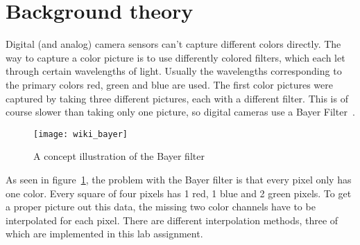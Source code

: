 \section{Background theory}

Digital (and analog) camera sensors can't capture different colors directly.
The way to capture a color picture is to use differently colored filters, which
each let through certain wavelengths of light. Usually the wavelengths
corresponding to the primary colors red, green and blue are used. The first
color pictures were captured by taking three different pictures, each with a
different filter. This is of course slower than taking only one picture, so
digital cameras use a Bayer Filter~\cite{wiki:bayer_filter}.

\begin{figure}[H]
  \centering
  \texttt{[image: wiki\_bayer]}
  \caption{A concept illustration of the Bayer filter~\cite{wiki:bayer_filter}}
\label{fig:wiki_bayer_filter}
\end{figure}

As seen in figure~\ref{fig:wiki_bayer_filter}, the problem with the Bayer
filter is that every pixel only has one color. Every square of four pixels has
1 red, 1 blue and 2 green pixels. To get a proper picture out this data, the
missing two color channels have to be interpolated for each pixel. There are
different interpolation methods, three of which are implemented in this lab
assignment.
